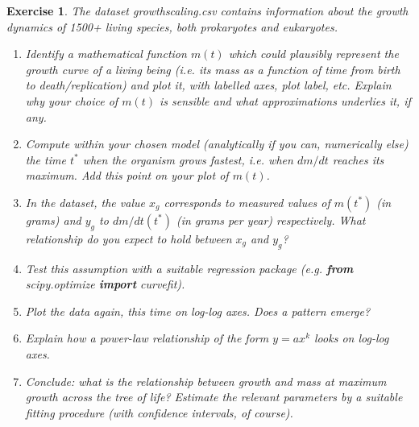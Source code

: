 \documentclass[english, 11pt]{article}
\newtheorem{Ex}{Exercise}
\begin{document}
\begin{Ex}
The dataset growth\textunderscore scaling.csv contains information about the growth dynamics of 1500+ living species, both  prokaryotes and eukaryotes. 

\begin{enumerate}
	\item Identify a mathematical function $m(t)$ which could plausibly represent the growth curve of a living being (i.e. its mass as a function of time from birth to death/replication) and plot it, with labelled axes, plot label, etc. Explain why your choice of $m(t)$ is sensible and what approximations underlies it, if any. 
	\item  Compute within your chosen model (analytically if you can,  numerically else) the time $t^*$ when the organism grows fastest, i.e. when $dm/dt$ reaches its maximum. Add this point on your plot of $m(t)$. 
	\item In the dataset, the value $x_g$ corresponds to measured values of $m(t^*)$ (in grams) and $y_g$ to $dm/dt(t^*)$ (in grams per year) respectively. What relationship do you expect to hold between $x_g$ and $y_g$?
	\item Test this assumption with a suitable regression package (e.g. \textbf{from} scipy.optimize \textbf{import} curve\textunderscore fit).
	\item Plot the data again, this time on log-log axes. Does a pattern emerge?
	\item Explain how a power-law relationship of the form $y=ax^k$ looks on log-log axes. 
	\item Conclude: what is the relationship between growth and mass at maximum growth across the tree of life? Estimate the relevant parameters by a suitable fitting procedure (with confidence intervals, of course). 
\end{enumerate}

\end{Ex}
\end{document}
